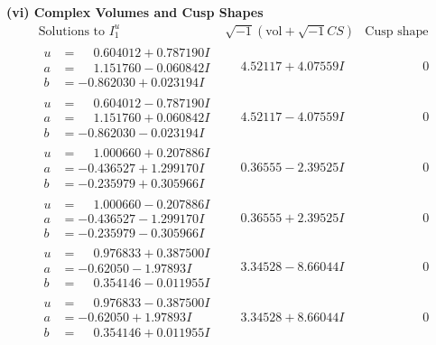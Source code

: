 \documentclass[1p]{elsarticle_modified}
\theoremstyle{definition}
\newcommand{\I}{\sqrt{-1}}
\begin{document}
\newpage\flushleft \textbf{(vi) Complex Volumes and Cusp Shapes}
$$\begin{array}{c|c|c}  
\text{Solutions to }I^u_{1}& \I (\text{vol} + \sqrt{-1}CS) & \text{Cusp shape}\\
 \hline 
\begin{aligned}
u &= \phantom{-}0.604012 + 0.787190 I \\
a &= \phantom{-}1.151760 - 0.060842 I \\
b &= -0.862030 + 0.023194 I\end{aligned}
 & \phantom{-}4.52117 + 4.07559 I & \phantom{-0.000000 } 0 \\ \hline\begin{aligned}
u &= \phantom{-}0.604012 - 0.787190 I \\
a &= \phantom{-}1.151760 + 0.060842 I \\
b &= -0.862030 - 0.023194 I\end{aligned}
 & \phantom{-}4.52117 - 4.07559 I & \phantom{-0.000000 } 0 \\ \hline\begin{aligned}
u &= \phantom{-}1.000660 + 0.207886 I \\
a &= -0.436527 + 1.299170 I \\
b &= -0.235979 + 0.305966 I\end{aligned}
 & \phantom{-}0.36555 - 2.39525 I & \phantom{-0.000000 } 0 \\ \hline\begin{aligned}
u &= \phantom{-}1.000660 - 0.207886 I \\
a &= -0.436527 - 1.299170 I \\
b &= -0.235979 - 0.305966 I\end{aligned}
 & \phantom{-}0.36555 + 2.39525 I & \phantom{-0.000000 } 0 \\ \hline\begin{aligned}
u &= \phantom{-}0.976833 + 0.387500 I \\
a &= -0.62050 - 1.97893 I \\
b &= \phantom{-}0.354146 - 0.011955 I\end{aligned}
 & \phantom{-}3.34528 - 8.66044 I & \phantom{-0.000000 } 0 \\ \hline\begin{aligned}
u &= \phantom{-}0.976833 - 0.387500 I \\
a &= -0.62050 + 1.97893 I \\
b &= \phantom{-}0.354146 + 0.011955 I\end{aligned}
 & \phantom{-}3.34528 + 8.66044 I & \phantom{-0.000000 } 0 \\ \hline\begin{aligned}

\end{aligned}
\end{array}$$
\end{document}
